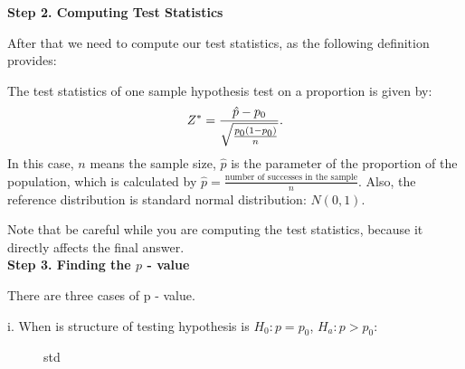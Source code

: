 \textbf{Step 2. Computing Test Statistics}

After that we need to compute our test statistics, as the following definition provides:

\begin{definition}
The test statistics of one sample hypothesis test on a proportion is given by: \[ Z^* = \frac{\hat{p} - p_{\text{\scriptsize$0$}}}{\sqrt{\frac{p_{\text{\scriptsize$0$}}(1-p_{\text{\scriptsize$0$}})}{n}}}.\]
In this case, $n$ means the sample size, $\hat{p}$ is the parameter of the proportion of the population, which is calculated by $\hat{p} = \frac{\text{number of successes in the sample}}{n}$. Also, the reference distribution is standard normal distribution: $N(0,1)$.
\end{definition}

Note that be careful while you are computing the test statistics, because it directly affects the final answer.\\

\textbf{Step 3. Finding the $p$ - value}

There are three cases of p - value.

i. When is structure of testing hypothesis is $H_0: p = p_0$, $H_a: p > p_0$:

\begin{center}
\begin{figure}[h!]
\centering
{}
\caption{std}
\end{figure}
\end{center}